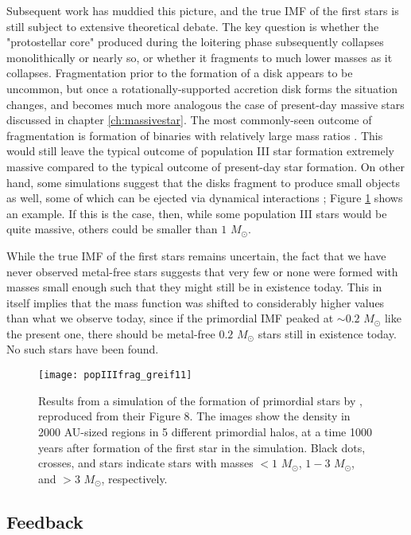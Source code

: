 Subsequent work has muddied this picture, and the true IMF of the first stars is still subject to extensive theoretical debate. The key question is whether the "protostellar core" produced during the loitering phase subsequently collapses monolithically or nearly so, or whether it fragments to much lower masses as it collapses. Fragmentation prior to the formation of a disk appears to be uncommon, but once a rotationally-supported accretion disk forms the situation changes, and becomes much more analogous the case of present-day massive stars discussed in chapter \ref{ch:massivestar}. The most commonly-seen outcome of fragmentation is formation of binaries with relatively large mass ratios \citep[e.g.,][]{stacy13a}. This would still leave the typical outcome of population III star formation extremely massive compared to the typical outcome of present-day star formation. On other hand, some simulations suggest that the disks fragment to produce small objects as well, some of which can be ejected via dynamical interactions \citep{clark11a, greif11a}; Figure \ref{fig:greif11a} shows an example. If this is the case, then, while some population III stars would be quite massive, others could be smaller than $1$ $M_\odot$.

While the true IMF of the first stars remains uncertain, the fact that we have never observed metal-free stars suggests that very few or none were formed with masses small enough such that they might still be in existence today. This in itself implies that the mass function was shifted to considerably higher values than what we observe today, since if the primordial IMF peaked at $\sim 0.2$ $M_\odot$ like the present one, there should be metal-free $0.2$ $M_\odot$ stars still in existence today. No such stars have been found.

\begin{figure}
\texttt{[image: popIIIfrag\_greif11]}
\caption[Disk fragmentation around a primordial star]{
\label{fig:greif11a}
Results from a simulation of the formation of primordial stars by \citet{greif11a}, reproduced from their Figure 8. The images show the density in 2000 AU-sized regions in 5 different primordial halos, at a time 1000 years after formation of the first star in the simulation. Black dots, crosses, and stars indicate stars with masses $<1$ $M_\odot$, $1-3$ $M_\odot$, and $>3$ $M_\odot$, respectively.
}
\end{figure}


\subsection{Feedback}

